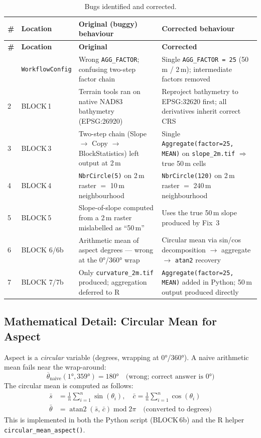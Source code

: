 \documentclass[11pt, a4paper]{article}
\begin{document}
\begin{longtable}{C{0.6cm}L{2cm}L{5.2cm}L{5.2cm}}
\caption{Bugs identified and corrected.}\label{tab:fixes}\\
\toprule
\textbf{\#} & \textbf{Location} & \textbf{Original (buggy) behaviour} & \textbf{Corrected behaviour} \\
\midrule
\endfirsthead
\toprule
\textbf{\#} & \textbf{Location} & \textbf{Original} & \textbf{Corrected} \\
\midrule
\endhead
\bottomrule
{} & \texttt{WorkflowConfig}
  & Wrong \texttt{AGG\_FACTOR}; confusing two-step factor chain
  & Single \texttt{AGG\_FACTOR = 25} (50\,m / 2\,m); intermediate factors removed \\[4pt]
2 & BLOCK\,1
  & Terrain tools ran on native NAD83 bathymetry (EPSG:26920)
  & Reproject bathymetry to EPSG:32620 first; all derivatives inherit correct CRS \\[4pt]
3 & BLOCK\,3
  & Two-step chain (Slope $\to$ Copy $\to$ BlockStatistics) left output at 2\,m
  & Single \texttt{Aggregate(factor=25, MEAN)} on \texttt{slope\_2m.tif} $\Rightarrow$ true 50\,m cells \\[4pt]
4 & BLOCK\,4
  & \texttt{NbrCircle(5)} on 2\,m raster $=$ 10\,m neighbourhood
  & \texttt{NbrCircle(120)} on 2\,m raster $=$ 240\,m neighbourhood \\[4pt]
5 & BLOCK\,5
  & Slope-of-slope computed from a 2\,m raster mislabelled as ``50\,m''
  & Uses the true 50\,m slope produced by Fix~3 \\[4pt]
6 & BLOCK 6/6b
  & Arithmetic mean of aspect degrees — wrong at the 0°/360° wrap
  & Circular mean via sin/cos decomposition $\to$ aggregate $\to$ \texttt{atan2} recovery \\[4pt]
7 & BLOCK 7/7b
  & Only \texttt{curvature\_2m.tif} produced; aggregation deferred to R
  & \texttt{Aggregate(factor=25, MEAN)} added in Python; 50\,m output produced directly \\
\end{longtable}

\subsection{Mathematical Detail: Circular Mean for Aspect}

Aspect is a \textit{circular} variable (degrees, wrapping at 0°/360°).
A naive arithmetic mean fails near the wrap-around:
\[
  \overline{\theta}_{\text{naive}}(1°, 359°) = 180°
  \quad \text{(wrong; correct answer is } 0°)
\]
The circular mean is computed as follows:
\begin{align}
  \bar{s} &= \frac{1}{n}\sum_{i=1}^{n}\sin(\theta_i),\quad
  \bar{c}  = \frac{1}{n}\sum_{i=1}^{n}\cos(\theta_i) \\[4pt]
  \bar{\theta} &= \operatorname{atan2}(\bar{s},\,\bar{c})
                  \;\mathrm{mod}\; 2\pi
                  \quad\text{(converted to degrees)}
\end{align}
This is implemented in both the Python script (BLOCK\,6b) and the R helper
\texttt{circular\_mean\_aspect()}.
\end{document}
